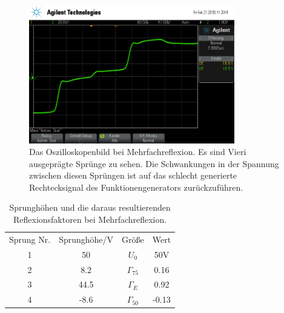 \begin{figure}[]
  \centering
  \includegraphics[width=0.8\textwidth]{reflex.png}
  \caption{Das Oszilloskopenbild bei Mehrfachreflexion. Es sind Vieri
    ausgeprägte Sprünge zu sehen. Die Schwankungen in der Spannung
    zwischen diesen Sprüngen ist auf das schlecht generierte
    Rechtecksignal des Funktionengenerators zurückzuführen.}
  \label{fig:mehrfachreflex}
\end{figure}
%
\begin{table}[h]
  \centering
  \begin{tabular}{SSSS}
    \toprule
    {Sprung Nr.}&{Sprunghöhe/}\si{\volt}&
    {Größe}&{Wert}\\
    \cmidrule(r){1-2} \cmidrule(l){3-4}
    1&50&{$U_0$}&50\si{\volt}\\
    2&8.2&{$\Gamma_{75}$}&0.16\\
    3&44.5&{$\Gamma_{E}$}&0.92\\
    4&-8.6&{$\Gamma_{50}$}&-0.13\\
    \bottomrule
  \end{tabular}
  \caption{Sprunghöhen und die daraus resultierenden 
    Reflexionsfaktoren bei Mehrfachreflexion.}
  \label{tab:mehrfachreflex}
\end{table}
%
\FloatBarrier
%
